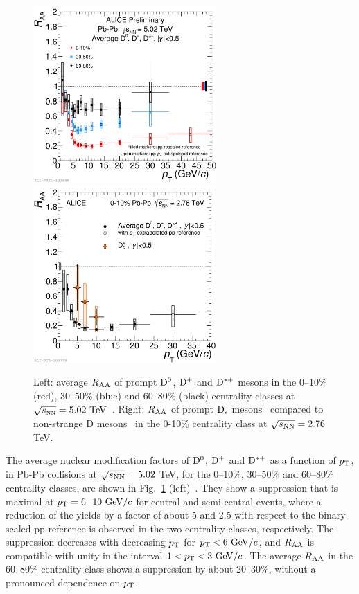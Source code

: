 \begin{figure}[!ht]
  \centering
    \includegraphics[width=7cm]{FigCap2/2017-Jul-05-DmesonAverage_010_3050_6080_comparison_04July2017.pdf}
    \includegraphics[width=7cm]{FigCap2/RAADsD_276.pdf}
  \caption{Left: average $R_{\rm AA}$ 
  of prompt ${\rm D^0}$, ${\rm D^+}$ and ${\rm D^{*+}}$ mesons in the 0--10\% (red), 30--50\% (blue) and 60--80\% (black) centrality classes at $\sqrt{s_{\rm \scriptscriptstyle NN}}=5.02~\mathrm{TeV}$~\cite{ALICE-PUBLIC-2017-003}. Right: $R_{\rm AA}$ of prompt ${\rm D_s}$ mesons~\cite{Adam:2015jda} compared to non-strange D mesons~\cite{Adam:2015sza} in the 0-10\% centrality class at $\sqrt{s_{\rm NN}} = 2.76$ TeV. }
  \label{fig:Raa}
\end{figure}

The average nuclear modification factors of ${\rm D^0}$, ${\rm D^+}$ and ${\rm D^{*+}}$ as a function of
$p_{\rm T}$, in Pb-Pb collisions at $\sqrt{s_{\rm NN}} = 5.02 $ TeV, for the 0--10\%, 30--50\% and 60--80\% centrality classes,
are shown in Fig.~\ref{fig:Raa} (left)~\cite{ALICE-PUBLIC-2017-003}. They show a suppression that is
maximal at $p_{\rm T}=6$--$10~\mathrm{GeV}/c$ for central and semi-central events, where a reduction of the yields by
a factor of about 5 and 2.5 with respect to the binary-scaled pp reference is observed 
in the two centrality classes, respectively.
The suppression decreases with decreasing $p_{\rm T}$ for $p_{\rm T}<6~\mathrm{GeV}/c$, and 
$R_{\rm AA}$ is compatible with unity  in the interval $1<p_{\rm T}<3~\mathrm{GeV}/c$.
The average $R_{\rm AA}$ in the 60--80\% centrality class shows a suppression by about 20--30\%, without a pronounced dependence on $p_{\rm T}$.\\


